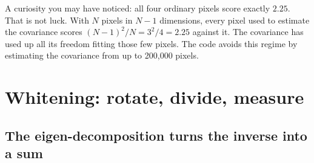 A curiosity you may have noticed: all four ordinary pixels score exactly $2.25$. That is not luck. With
$N$ pixels in $N-1$ dimensions, every pixel used to estimate the covariance scores
$(N-1)^2/N=3^2/4=2.25$ against it. The covariance has used up all its freedom fitting those few pixels. The
code avoids this regime by estimating the covariance from up to 200,000 pixels.

\section{Whitening: rotate, divide, measure}\label{sec:residualmaha:whiten}

\subsection{The eigen-decomposition turns the inverse into a sum}

